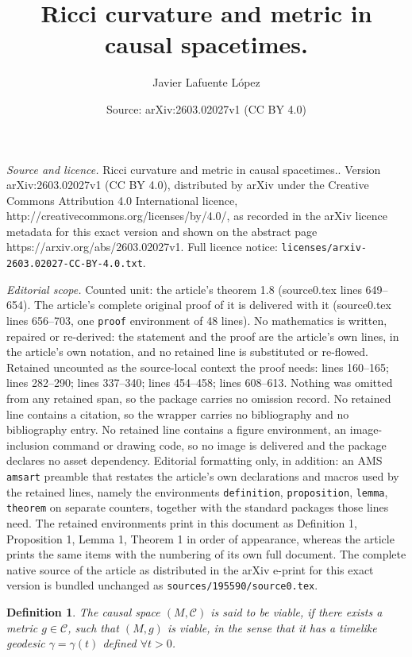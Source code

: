 \documentclass[10pt,a4paper]{amsart}
\title{Ricci curvature and metric in causal spacetimes.}
\author{Javier Lafuente L\'{o}pez}
\date{Source: arXiv:2603.02027v1 (CC BY 4.0)}
\newtheorem{definition}{Definition}
\begin{document}
\maketitle

\noindent\emph{Source and licence.} Ricci curvature and metric in causal spacetimes.. Version arXiv:2603.02027v1 (CC BY 4.0), distributed by arXiv under the Creative Commons Attribution 4.0 International licence, http://creativecommons.org/licenses/by/4.0/, as recorded in the arXiv licence metadata for this exact version and shown on the abstract page https://arxiv.org/abs/2603.02027v1. Full licence notice: \texttt{licenses/arxiv-2603.02027-CC-BY-4.0.txt}.\par\smallskip

\noindent\textit{Editorial scope.} Counted unit: the article's theorem 1.8 (source0.tex lines 649--654). The article's complete original proof of it is delivered with it (source0.tex lines 656--703, one \texttt{proof} environment of 48 lines). No mathematics is written, repaired or re-derived: the statement and the proof are the article's own lines, in the article's own notation, and no retained line is substituted or re-flowed.  Retained uncounted as the source-local context the proof needs: lines 160--165; lines 282--290; lines 337--340; lines 454--458; lines 608--613.  Nothing was omitted from any retained span, so the package carries no omission record.  No retained line contains a citation, so the wrapper carries no bibliography and no bibliography entry.  No retained line contains a figure environment, an image-inclusion command or drawing code, so no image is delivered and the package declares no asset dependency.  Editorial formatting only, in addition: an AMS \texttt{amsart} preamble that restates the article's own declarations and macros used by the retained lines, namely the environments \texttt{definition}, \texttt{proposition}, \texttt{lemma}, \texttt{theorem} on separate counters, together with the standard packages those lines need.  The retained environments print in this document as Definition 1, Proposition 1, Lemma 1, Theorem 1 in order of appearance, whereas the article prints the same items with the numbering of its own full document.  The complete native source of the article as distributed in the arXiv e-print for this exact version is bundled unchanged as \texttt{sources/195590/source0.tex}.
\begin{definition}
\label{viable} The causal space $\left(  M,\mathcal{C}\right)  $ is said to be
viable, if there exists a metric $g\in\mathcal{C}$, such that $\left(
M,g\right)  $ is viable, in the sense that it has a timelike geodesic
$\gamma=\gamma\left(  t\right)  $ defined $\forall t>0$.
\end{definition}
\end{document}
